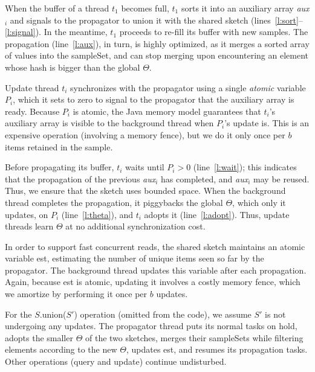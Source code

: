 When the buffer of a thread $t_1$ becomes full, $t_1$ sorts it
into an auxiliary array \emph{aux$_i$} and signals to the propagator  to union
it with the shared sketch (lines~\ref{l:sort}--\ref{l:signal}).
In the meantime, $t_1$ proceeds to re-fill its buffer with new samples.
The propagation  (line~\ref{l:aux}), in turn,  is highly optimized, as it merges a sorted array of 
values into the sampleSet, and can stop merging upon encountering 
an element whose hash is bigger than the global $\Theta$.

Update thread $t_i$ synchronizes with the propagator using a 
single \emph{atomic} variable $P_i$, which it sets to zero 
to signal to the propagator that the auxiliary array is ready.  
Because $P_i$ is  atomic, the Java memory model
guarantees that $t_i$'s auxiliary array is visible to
the background thread when $P_i$'s update is.
This is  an expensive operation (involving a memory fence),  
but we do it only once per $b$ items retained in the sample.

Before propagating its buffer, $t_i$ waits
until $P_i > 0$  (line~\ref{l:wait}); 
this indicates that the propagation of the previous \emph{aux}$_i$
 has completed, and  \emph{aux}$_i$ may
be reused. Thus, we  ensure that the sketch uses bounded space.
%
When the background thread completes the propagation, 
it piggybacks the global $\Theta$, which only it updates, on $P_i$  (line~\ref{l:theta}), 
and $t_i$ adopts it  (line~\ref{l:adopt}). Thus, update threads   learn $\Theta$ at no
additional synchronization cost. 

In order to support  fast concurrent reads, the shared sketch
maintains an atomic variable est, estimating the number of
 unique items seen so far by the propagator.
The background thread updates this variable after each propagation.
Again, because est is atomic, updating it involves a costly memory fence, which we amortize by performing it once per $b$ updates. 

For the $S$.union($S'$) operation (omitted from the code), 
we assume $S'$ is not undergoing any updates. 
The propagator thread puts its normal tasks on hold, 
 adopts the smaller $\Theta$ of the two sketches, merges their sampleSets while filtering elements according to the new $\Theta$, updates est, and resumes its 
 propagation tasks. Other operations (query and update) continue undisturbed.


